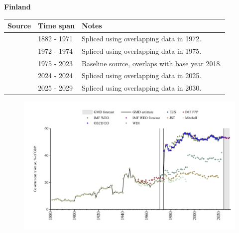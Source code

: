 \documentclass[12pt,a4paper,landscape]{article}
\begin{document}
\begin{adjustbox}{max totalsize={\paperwidth}{\paperheight},center}
\begin{minipage}[t][\textheight][t]{\textwidth}
\vspace*{0.5cm}
{}
\begin{center}
{\Large\bfseries Finland}
\end{center}
\vspace{0.5cm}
\begin{table}[H]
\centering
\small
\begin{tabular}{|l|l|l|}
\hline
\textbf{Source} & \textbf{Time span} & \textbf{Notes} \\
\hline
\rowcolor{white}\cite{JST}& 1882 - 1971 &Spliced using overlapping data in 1972.\\
\rowcolor{lightgray}\cite{WDI}& 1972 - 1974 &Spliced using overlapping data in 1975.\\
\rowcolor{white}\cite{OECD_EO}& 1975 - 2023 &Baseline source, overlaps with base year 2018.\\
\rowcolor{lightgray}\cite{EUS}& 2024 - 2024 &Spliced using overlapping data in 2025.\\
\rowcolor{white}\cite{IMF_WEO_forecast}& 2025 - 2029 &Spliced using overlapping data in 2030.\\
\hline
\end{tabular}
\end{table}
\begin{figure}[H]
\centering
\includegraphics[width=\textwidth,height=0.6\textheight,keepaspectratio]{graphs/FIN_govrev_GDP.pdf}
\end{figure}
\end{minipage}
\end{adjustbox}
\end{document}
